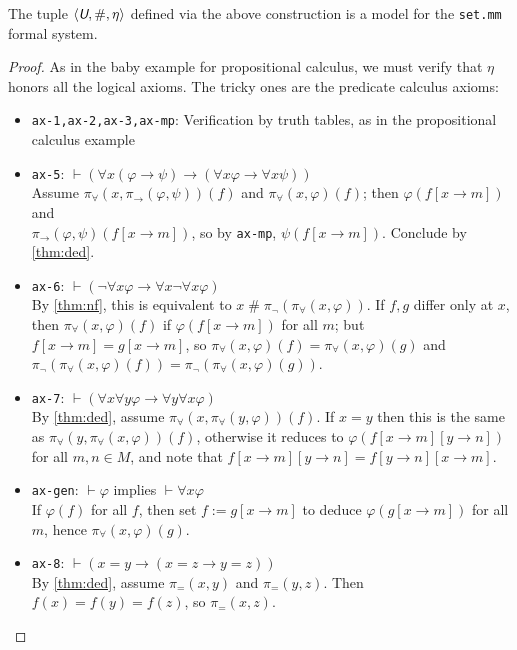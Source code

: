 \documentclass[runningheads,a4paper]{llncs}
\newcommand{\uv}{\textit{\textsf{U}}} %
\newcommand{\ang}[1]{\langle#1\rangle}
\newcommand{\vph}{\varphi}
\newcommand{\fresh}{\mathbin{\#}}
\begin{document}
\begin{theorem}\label{thm:setmodel}
The tuple $\ang{\uv,\fresh,\eta}$ defined via the above construction is a model for the {\normalfont\texttt{set.mm}} formal system.
\end{theorem}
\begin{proof}
As in the baby example for propositional calculus, we must verify that $\eta$ honors all the logical axioms. The tricky ones are the predicate calculus axioms:

\begin{itemize}
  \item \texttt{ax-1,ax-2,ax-3,ax-mp}: Verification by truth tables, as in the propositional calculus example
  
  \item \texttt{ax-5}: $\vdash(\forall x(\vph\to\psi)\to(\forall x\vph\to\forall x\psi))$\\
  Assume $\pi_\forall(x,\pi_\to(\vph,\psi))(f)$ and $\pi_\forall(x,\vph)(f)$; then $\vph(f[x\to m])$ and\\ $\pi_\to(\vph,\psi)(f[x\to m])$, so by \texttt{ax-mp}, $\psi(f[x\to m])$. Conclude by \autoref{thm:ded}.
  \item \texttt{ax-6}: $\vdash(\lnot\forall x\vph\to\forall x\lnot\forall x\vph)$\\
  By \autoref{thm:nf}, this is equivalent to $x\fresh\pi_\lnot(\pi_\forall(x,\vph))$.
  If $f,g$ differ only at $x$, then $\pi_\forall(x,\vph)(f)$ if $\vph(f[x\to m])$ for all $m$; but $f[x\to m]=g[x\to m]$, so $\pi_\forall(x,\vph)(f)=\pi_\forall(x,\vph)(g)$ and $\pi_\lnot(\pi_\forall(x,\vph)(f)) = \pi_\lnot(\pi_\forall(x,\vph)(g))$.
  \item \texttt{ax-7}: $\vdash(\forall x\forall y\vph\to\forall y\forall x\vph)$\\
  By \autoref{thm:ded}, assume $\pi_\forall(x,\pi_\forall(y,\vph))(f)$. If $x=y$ then this is the same as $\pi_\forall(y,\pi_\forall(x,\vph))(f)$, otherwise it reduces to $\vph(f[x\to m][y\to n])$ for all $m,n\in M$, and note that $f[x\to m][y\to n]=f[y\to n][x\to m]$.
  \item \texttt{ax-gen}: $\vdash\vph$ implies $\vdash\forall x\vph$\\
  If $\vph(f)$ for all $f$, then set $f:=g[x\to m]$ to deduce $\vph(g[x\to m])$ for all $m$, hence $\pi_\forall(x,\vph)(g)$.
  \item \texttt{ax-8}: $\vdash(x=y\to(x=z\to y=z))$\\
  By \autoref{thm:ded}, assume $\pi_=(x,y)$ and $\pi_=(y,z)$. Then $f(x)=f(y)=f(z)$, so $\pi_=(x,z)$.

\end{itemize}
\end{proof}
\end{document}
